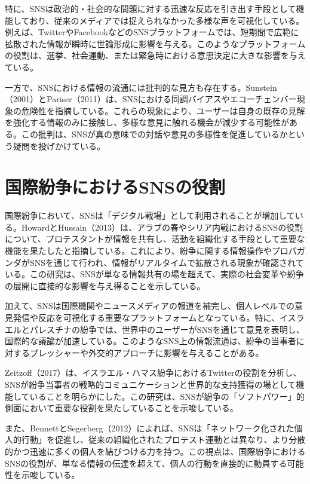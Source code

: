 \documentclass[11pt, a4j]{jreport}
\begin{document}
    特に、SNSは政治的・社会的な問題に対する迅速な反応を引き出す手段として機能しており、従来のメディアでは捉えられなかった多様な声を可視化している。例えば、TwitterやFacebookなどのSNSプラットフォームでは、短期間で広範に拡散された情報が瞬時に世論形成に影響を与える。このようなプラットフォームの役割は、選挙、社会運動、または緊急時における意思決定に大きな影響を与えている。

    一方で、SNSにおける情報の流通には批判的な見方も存在する。Sunstein（2001）とPariser（2011）は、SNSにおける同調バイアスやエコーチェンバー現象の危険性を指摘している。これらの現象により、ユーザーは自身の既存の見解を強化する情報のみに接触し、多様な意見に触れる機会が減少する可能性がある。この批判は、SNSが真の意味での対話や意見の多様性を促進しているかという疑問を投げかけている。

    \section{国際紛争におけるSNSの役割}
    国際紛争において、SNSは「デジタル戦場」として利用されることが増加している。HowardとHussain（2013）は、アラブの春やシリア内戦におけるSNSの役割について、プロテスタントが情報を共有し、活動を組織化する手段として重要な機能を果たしたと指摘している。これにより、紛争に関する情報操作やプロパガンダがSNSを通じて行われ、情報がリアルタイムで拡散される現象が確認されている。この研究は、SNSが単なる情報共有の場を超えて、実際の社会変革や紛争の展開に直接的な影響を与え得ることを示している。

    加えて、SNSは国際機関やニュースメディアの報道を補完し、個人レベルでの意見発信や反応を可視化する重要なプラットフォームとなっている。特に、イスラエルとパレスチナの紛争では、世界中のユーザーがSNSを通じて意見を表明し、国際的な議論が加速している。このようなSNS上の情報流通は、紛争の当事者に対するプレッシャーや外交的アプローチに影響を与えることがある。

    Zeitzoff（2017）は、イスラエル・ハマス紛争におけるTwitterの役割を分析し、SNSが紛争当事者の戦略的コミュニケーションと世界的な支持獲得の場として機能していることを明らかにした。この研究は、SNSが紛争の「ソフトパワー」的側面において重要な役割を果たしていることを示唆している。

    また、BennettとSegerberg（2012）によれば、SNSは「ネットワーク化された個人的行動」を促進し、従来の組織化されたプロテスト運動とは異なり、より分散的かつ迅速に多くの個人を結びつける力を持つ。この視点は、国際紛争におけるSNSの役割が、単なる情報の伝達を超えて、個人の行動を直接的に動員する可能性を示唆している。
\end{document}
